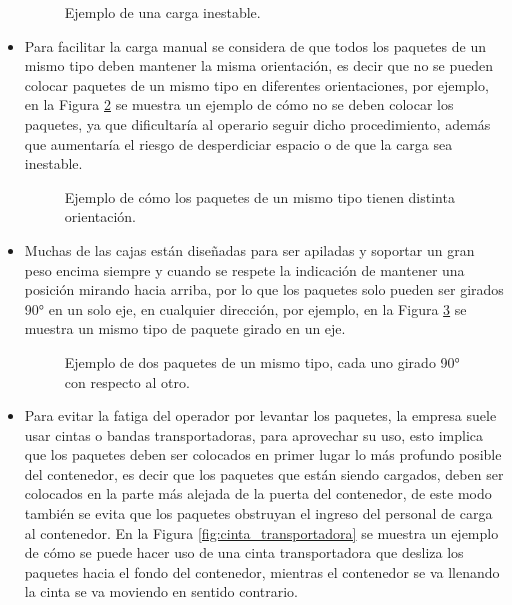 \documentclass[openany]{article}
\begin{document}
\begin{itemize}
\begin{figure}[H]
              \caption{Ejemplo de una carga inestable.}
              \label{fig:paquetes_mal_apilados}
          \end{figure}
    \item Para facilitar la carga manual se considera de que todos los paquetes de un mismo tipo deben mantener la misma orientación, es decir que no se pueden colocar paquetes de un mismo tipo en diferentes orientaciones, por ejemplo, en la Figura \ref{fig:paquetes_mal_orientados} se muestra un ejemplo de cómo no se deben colocar los paquetes, ya que dificultaría al operario seguir dicho procedimiento, además que aumentaría el riesgo de desperdiciar espacio o de que la carga sea inestable.
          \begin{figure}[H]
              \centering
              
              \caption{Ejemplo de cómo los paquetes de un mismo tipo tienen distinta orientación.}
              \label{fig:paquetes_mal_orientados}
          \end{figure}
    \item Muchas de las cajas están diseñadas para ser apiladas y soportar un gran peso encima siempre y cuando se respete la indicación de mantener una posición mirando hacia arriba, por lo que los paquetes solo pueden ser girados 90° en un solo eje, en cualquier dirección, por ejemplo, en la Figura \ref{fig:paquetes_girados} se muestra un mismo tipo de paquete girado en un eje.
          \begin{figure}[H]
              \centering
              
              \caption{Ejemplo de dos paquetes de un mismo tipo, cada uno girado 90° con respecto al otro.}
              \label{fig:paquetes_girados}
          \end{figure}
    \item Para evitar la fatiga del operador por levantar los paquetes, la empresa suele usar cintas o bandas transportadoras, para aprovechar su uso, esto implica que los paquetes deben ser colocados en primer lugar lo más profundo posible del contenedor, es decir que los paquetes que están siendo cargados, deben ser colocados en la parte más alejada de la puerta del contenedor, de este modo también se evita que los paquetes obstruyan el ingreso del personal de carga al contenedor. En la Figura \ref{fig:cinta_transportadora} se muestra un ejemplo de cómo se puede hacer uso de una cinta transportadora que desliza los paquetes hacia el fondo del contenedor, mientras el contenedor se va llenando la cinta se va moviendo en sentido contrario.

\end{itemize}
\end{document}
